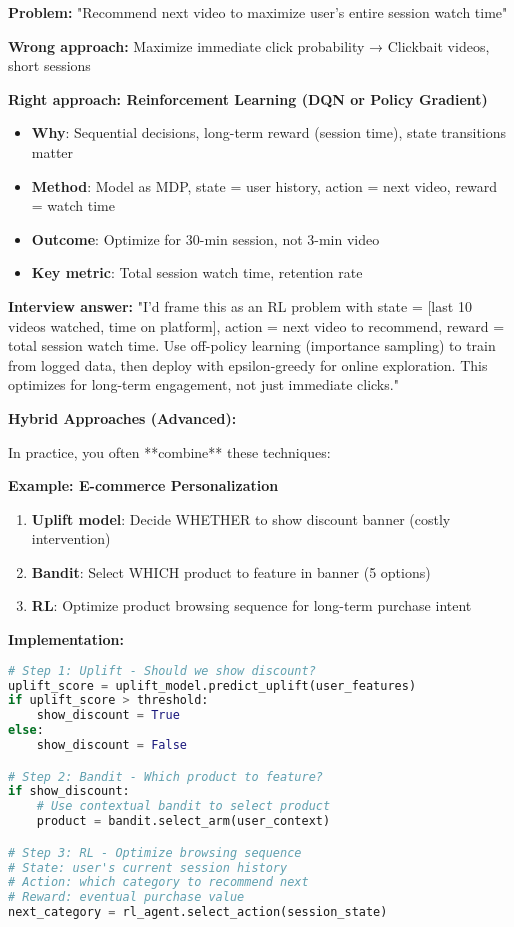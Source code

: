 \documentclass[10pt]{article}
\begin{document}
\textbf{Problem:} "Recommend next video to maximize user's entire session watch time"

\textbf{Wrong approach:} Maximize immediate click probability → Clickbait videos, short sessions

\textbf{Right approach: Reinforcement Learning (DQN or Policy Gradient)}
\begin{itemize}
\item \textbf{Why}: Sequential decisions, long-term reward (session time), state transitions matter
\item \textbf{Method}: Model as MDP, state = user history, action = next video, reward = watch time
\item \textbf{Outcome}: Optimize for 30-min session, not 3-min video
\item \textbf{Key metric}: Total session watch time, retention rate
\end{itemize}

\textbf{Interview answer:} "I'd frame this as an RL problem with state = [last 10 videos watched, time on platform], action = next video to recommend, reward = total session watch time. Use off-policy learning (importance sampling) to train from logged data, then deploy with epsilon-greedy for online exploration. This optimizes for long-term engagement, not just immediate clicks."

\textbf{Hybrid Approaches (Advanced):}

In practice, you often **combine** these techniques:

\textbf{Example: E-commerce Personalization}
\begin{enumerate}
\item \textbf{Uplift model}: Decide WHETHER to show discount banner (costly intervention)
\item \textbf{Bandit}: Select WHICH product to feature in banner (5 options)
\item \textbf{RL}: Optimize product browsing sequence for long-term purchase intent
\end{enumerate}

\textbf{Implementation:}
\begin{lstlisting}[language=Python]
# Step 1: Uplift - Should we show discount?
uplift_score = uplift_model.predict_uplift(user_features)
if uplift_score > threshold:
    show_discount = True
else:
    show_discount = False

# Step 2: Bandit - Which product to feature?
if show_discount:
    # Use contextual bandit to select product
    product = bandit.select_arm(user_context)

# Step 3: RL - Optimize browsing sequence
# State: user's current session history
# Action: which category to recommend next
# Reward: eventual purchase value
next_category = rl_agent.select_action(session_state)
\end{lstlisting}
\end{document}
